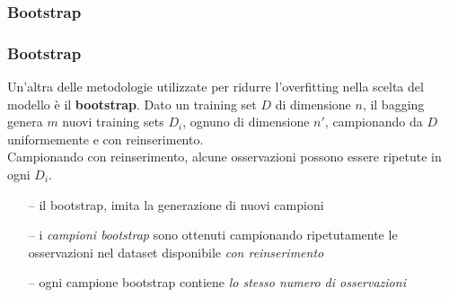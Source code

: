 %
%
%
%
%
%


\subsubsection[Bootstrap]{Bootstrap}

\begin{frame}

	\frametitle{Bootstrap}
	Un'altra delle metodologie utilizzate per ridurre l'overfitting nella scelta del modello è il	 \textbf{bootstrap}.
	\newlinedouble
	Dato un training set $D$ di dimensione $n$, il bagging genera $m$ nuovi training sets $D_i$, ognuno di dimensione $n'$, campionando da $D$ uniformemente e con reinserimento.\\
	Campionando con reinserimento, alcune osservazioni possono essere ripetute in ogni $D_i$.
	\begin{itemize}
		\item[--] il bootstrap, imita la generazione di nuovi campioni
		\item[--] i \emph{campioni bootstrap} sono ottenuti campionando ripetutamente le osservazioni nel dataset disponibile \emph{con reinserimento}
		\item[--] ogni campione bootstrap contiene \emph{lo stesso numero di osservazioni}
	\end{itemize}

\end{frame}


